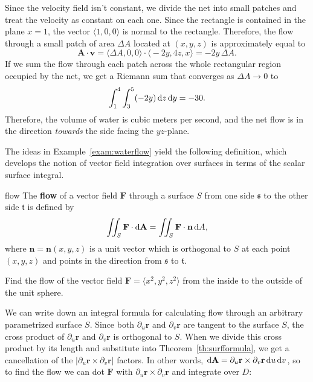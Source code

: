 \documentclass{watsonbook}
\begin{document}
\begin{solution}
  Since the velocity field isn't constant, we divide the net into
  small patches and treat the velocity as constant on each one. Since
  the rectangle is contained in the plane $x=1$, the vector
  $\langle 1, 0, 0 \rangle$ is normal to the rectangle. Therefore, the flow
  through a small patch of area $\Delta A$ located at $(x,y,z)$ is
  approximately equal to
  \[
    \mathbf{A} \cdot \mathbf{v} = \big\langle \Delta A, 0, 0 \big\rangle \cdot
    \big\langle -2y, 4z, x \big\rangle = -2y \, \Delta A. 
  \]
  If we sum the flow through each patch across the whole rectangular
  region occupied by the net, we get a Riemann sum that converges as
  $\Delta A \to 0$ to
  \[
    \int_1^4 \int_3^5 (-2y) \, \mathrm{d} z \, \mathrm{d} y = -30. 
  \]
  Therefore, the volume of water is  cubic meters per
  second, and the net flow is in the direction \textit{towards} the
  side facing the $yz$-plane.
\end{solution}

The ideas in Example~\ref{exam:waterflow} yield the following
definition, which develops the notion of vector field integration over
surfaces in terms of the scalar surface
integral. 

\begin{defn}{}{flow}
  The \textbf{flow} of a vector field $\mathbf{F}$ through a surface
  $S$ from one side $\mathfrak{s}$ to the other side $\mathfrak{t}$ is defined by
  \[
    \iint_S \mathbf{F} \cdot \mathrm{d}\mathbf{A} =  \iint_S \mathbf{F} \cdot \mathbf{n}
    \, {\mathrm{d}}A, 
  \]
  where $\mathbf{n}=\mathbf{n}(x,y,z)$ is a unit vector which is
  orthogonal to $S$ at each point $(x,y,z)$ and points in the
  direction from $\mathfrak{s}$ to $\mathfrak{t}$. 
\end{defn}

\begin{exercise}{}{}
  Find the flow of the vector field $\mathbf{F} = \langle x^2, y^2, z^2 \rangle$
  from the inside to the outside of the unit sphere. 
\end{exercise}

We can write down an integral formula for calculating flow through an
arbitrary parametrized surface $S$. Since both $\partial_u \mathbf{r}$
and $\partial_v \mathbf{r}$ are tangent to the surface $S$, the cross
product of $\partial_u \mathbf{r} $ and $\partial_v \mathbf{r}$ is
orthogonal to $S$. When we divide this cross product by its length and
substitute into Theorem~\ref{th:surfformula}, we get a cancellation of
the $|\partial_u \mathbf{r} \times \partial_v \mathbf{r}|$ factors. In
other words,
$\mathrm{d}\mathbf{A} = \partial_u \mathbf{r} \times \partial_v \mathbf{r} \,
\mathrm{d} u \, \mathrm{d} v$, so to find the flow we can dot $\mathbf{F}$ with
$\partial_u \mathbf{r} \times \partial_v \mathbf{r}$ and integrate
over $D$:
\end{document}
